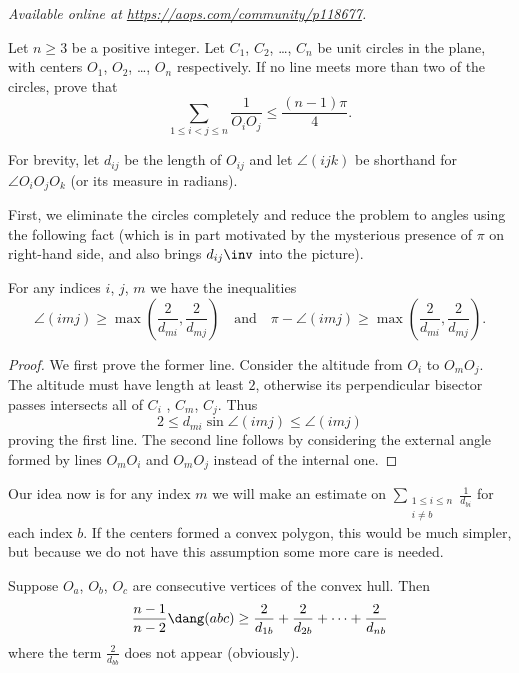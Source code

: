 
\textsl{Available online at \url{https://aops.com/community/p118677}.}
\begin{mdframed}[style=mdpurplebox,frametitle={Problem statement}]
Let $n \ge 3$ be a positive integer.
Let $C_1$, $C_2$, \dots, $C_n$ be unit circles in the plane,
with centers $O_1$, $O_2$, \dots, $O_n$ respectively.
If no line meets more than two of the circles, prove that
\[ \sum_{1 \le i < j \le n } \frac{1}{O_i O_j}
  \le \frac{(n-1)\pi}{4}. \]
\end{mdframed}
For brevity, let $d_{ij}$ be the length of $O_{ij}$
and let $\angle(ijk)$ be shorthand for $\angle O_i O_j O_k$
(or its measure in radians).

First, we eliminate the circles completely
and reduce the problem to angles using the following fact
(which is in part motivated by the mysterious
presence of $\pi$ on right-hand side,
and also brings $d_{ij}\inv$ into the picture).

\begin{lemma*}
  For any indices $i$, $j$, $m$ we have the inequalities
  \[ \angle (imj) \ge
      \max \left( \frac{2}{d_{mi}}, \frac{2}{d_{mj}} \right)
      \quad\text{and}\quad
    \pi - \angle (imj) \ge
    \max \left( \frac{2}{d_{mi}}, \frac{2}{d_{mj}} \right). \]
\end{lemma*}
\begin{proof}
  We first prove the former line.
  Consider the altitude from $O_i$ to $O_m O_j$.
  The altitude must have length at least $2$,
  otherwise its perpendicular bisector passes
  intersects all of $C_i$ , $C_m$, $C_j$.
  Thus
  \[ 2 \le d_{mi} \sin \angle(imj) \le \angle(imj) \]
  proving the first line.
  The second line follows by considering the external
  angle formed by lines $O_m O_i$ and $O_m O_j$
  instead of the internal one.
\end{proof}

Our idea now is for any index $m$
we will make an estimate on
$\sum_{\substack{1 \le i \le n \\ i \neq b}} \frac{1}{d_{bi}}$
for each index $b$.
If the centers formed a convex polygon,
this would be much simpler,
but because we do not have this assumption some more care is needed.

\begin{claim*}
  Suppose $O_a$, $O_b$, $O_c$ are consecutive vertices
  of the convex hull.
  Then
  \[ \frac{n-1}{n-2} \dang(abc) \ge \frac{2}{d_{1b}} + \frac{2}{d_{2b}}
    + \dots + \frac{2}{d_{nb}} \]
  where the term $\frac{2}{d_{bb}}$ does not appear (obviously).
\end{claim*}

